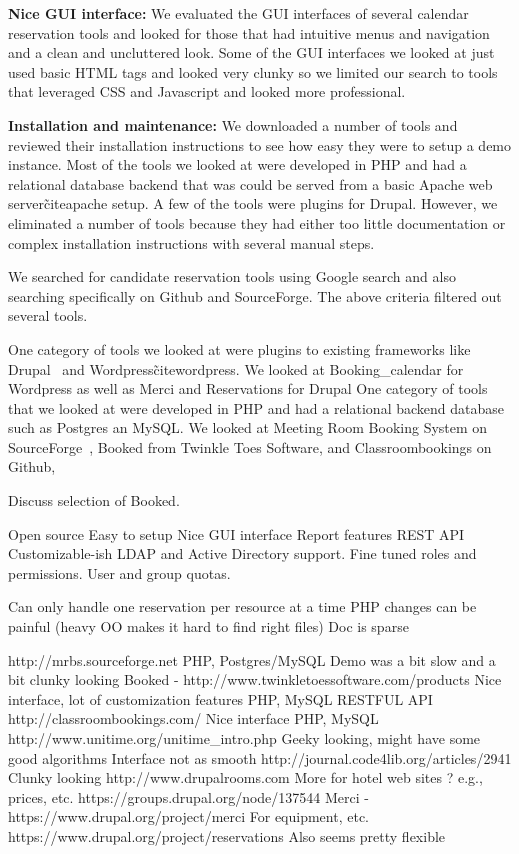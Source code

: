 \documentclass{acm_proc_article-sp}
\begin{document}
\textbf{Nice GUI interface:}  We evaluated the GUI interfaces of several calendar reservation tools and looked for those that had intuitive menus and navigation and  a clean and uncluttered look.  Some of the GUI interfaces we looked at just used basic HTML tags and looked very clunky so we limited our search to tools that leveraged CSS and Javascript and looked more professional.   

\textbf{Installation and maintenance:}  We downloaded a number of tools and reviewed their installation instructions to see how easy they were to setup a demo instance.  Most of the tools we looked at were developed in PHP and had a relational database backend that was could be served from a basic  Apache web server\~cite{apache} setup.   A few of the tools were plugins for Drupal.  However, we eliminated a number of tools because they had either too little documentation or complex installation instructions with several manual steps.   

We searched for candidate reservation tools using Google search and also searching specifically on Github and SourceForge.  The above criteria filtered out several tools.  

One category of tools we looked at were plugins to existing frameworks like Drupal~\cite{drupal} and Wordpress\~cite{wordpress}.  We looked at Booking_calendar for Wordpress as well as Merci and Reservations for Drupal   
One category of tools that we looked at were developed in PHP and had a relational backend database such as Postgres an MySQL.  We looked at Meeting Room Booking System on SourceForge~\cite{mrbs}, Booked from Twinkle Toes Software, and Classroombookings on Github, 



Discuss selection of Booked.

Open source
Easy to setup
Nice GUI interface
Report features
REST API
Customizable-ish
LDAP and Active Directory support.
Fine tuned roles and permissions.
User and group quotas.

Can only handle one reservation per resource at a time
PHP changes can be painful (heavy OO makes it hard to find right files)
Doc is sparse

http://mrbs.sourceforge.net
	PHP, Postgres/MySQL
	Demo was a bit slow and a bit clunky looking
Booked - http://www.twinkletoessoftware.com/products
	Nice interface, lot of customization features
	PHP, MySQL
	RESTFUL API
http://classroombookings.com/
	Nice interface
	PHP, MySQL
http://www.unitime.org/unitime\_intro.php
	Geeky looking, might have some good algorithms
	Interface not as smooth
	http://journal.code4lib.org/articles/2941
	Clunky looking
http://www.drupalrooms.com
	More for hotel web sites ? e.g., prices, etc.
https://groups.drupal.org/node/137544
	Merci - https://www.drupal.org/project/merci
		For equipment, etc.
	https://www.drupal.org/project/reservations
		Also seems pretty flexible
		
\end{document}

